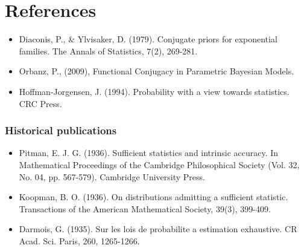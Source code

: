 \documentclass[12pt]{article}
\begin{document}
\section*{References}

\begin{itemize}
\item Diaconis, P., \& Ylvisaker, D. (1979). Conjugate priors for exponential families. The Annals of Statistics, 7(2), 269-281.
\item Orbanz, P., (2009), Functional Conjugacy in Parametric Bayesian Models.
\item Hoffman-Jorgensen, J. (1994). Probability with a view towards statistics. CRC Press.
\end{itemize}

\subsubsection*{Historical publications}
\begin{itemize}
\item Pitman, E. J. G. (1936). Sufficient statistics and intrinsic accuracy. In Mathematical Proceedings of the Cambridge Philosophical Society (Vol. 32, No. 04, pp. 567-579). Cambridge University Press.
\item Koopman, B. O. (1936). On distributions admitting a sufficient statistic. Transactions of the American Mathematical Society, 39(3), 399-409.
\item Darmois, G. (1935). Sur les lois de probabilite a estimation exhaustive. CR Acad. Sci. Paris, 260, 1265-1266.
\end{itemize}
\end{document}
